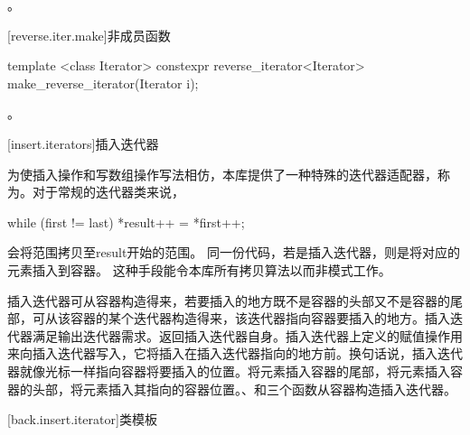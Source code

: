 \begin{itemdescr}
\pnum
\returns
{}。
\end{itemdescr}

[reverse.iter.make]{非成员函数}

%
\begin{itemdecl}
template <class Iterator>
  constexpr reverse_iterator<Iterator> make_reverse_iterator(Iterator i);
\end{itemdecl}

\begin{itemdescr}
\pnum
\returns
{}。
\end{itemdescr}

[insert.iterators]{插入迭代器}

\pnum
为使插入操作和写数组操作写法相仿，本库提供了一种特殊的迭代器适配器，称为。对于常规的迭代器类来说，

\begin{codeblock}
while (first != last) *result++ = *first++;
\end{codeblock}

会将范围拷贝至result开始的范围。
同一份代码，若是插入迭代器，则是将对应的元素插入到容器。
这种手段能令本库所有拷贝算法以而非模式工作。

\pnum
插入迭代器可从容器构造得来，若要插入的地方既不是容器的头部又不是容器的尾部，可从该容器的某个迭代器构造得来，该迭代器指向容器要插入的地方。插入迭代器满足输出迭代器需求。返回插入迭代器自身。插入迭代器上定义的赋值操作用来向插入迭代器写入，它将插入在插入迭代器指向的地方前。换句话说，插入迭代器就像光标一样指向容器将要插入的位置。将元素插入容器的尾部，将元素插入容器的头部，将元素插入其指向的容器位置。、和三个函数从容器构造插入迭代器。

[back.insert.iterator]{类模板}

